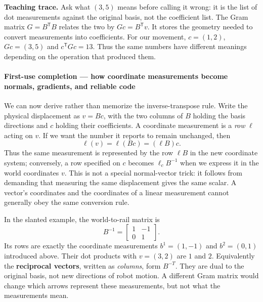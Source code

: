 \textbf{Teaching trace.} Ask what \((3,5)\) means before calling it wrong: it is the list of dot measurements against the original basis, not the coefficient list. The Gram matrix \(G=B^{\mathsf T}B\) relates the two by \(Gc=B^{\mathsf T}v\). It stores the geometry needed to convert measurements into coefficients. For our movement, \(c=(1,2)\), \(Gc=(3,5)\) and \(c^{\mathsf T}Gc=13\). Thus the same numbers have different meanings depending on the operation that produced them.

\paragraph{First-use completion --- how coordinate measurements become normals, gradients, and reliable code}\label{01-foundations-i-ch017-first-use-completion-how-coordinate-measurements-become-normals-gradients-and-reliable-code}

We can now derive rather than memorize the inverse-transpose rule. Write the physical displacement as \(v=Bc\), with the two columns of \(B\) holding the basis directions and \(c\) holding their coefficients. A coordinate measurement is a \emph{row} \(\ell\) acting on \(v\). If we want the number it reports to remain unchanged, then \[
\ell(v)=\ell(Bc)=(\ell B)c.
\] Thus the same measurement is represented by the row \(\ell B\) in the new coordinate system; conversely, a row specified on \(c\) becomes \(\ell_c B^{-1}\) when we express it in the world coordinates \(v\). This is not a special normal-vector trick: it follows from demanding that measuring the same displacement gives the same scalar. A vector's coordinates and the coordinates of a linear measurement cannot generally obey the same conversion rule.

In the slanted example, the world-to-rail matrix is \[
B^{-1}=\begin{bmatrix}1&-1\\0&1\end{bmatrix}.
\] Its rows are exactly the coordinate measurements \(b^1=(1,-1)\) and \(b^2=(0,1)\) introduced above. Their dot products with \(v=(3,2)\) are \(1\) and \(2\). Equivalently the \textbf{reciprocal vectors}, written as \emph{columns}, form \(B^{-T}\). They are dual to the original basis, not new directions of robot motion. A different Gram matrix would change which arrows represent these measurements, but not what the measurements mean.

